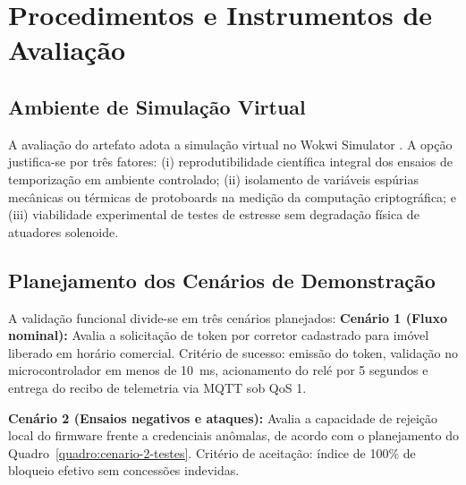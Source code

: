 \section{Procedimentos e Instrumentos de Avaliação}
\label{sec:procedimentos-avaliacao}

\subsection{Ambiente de Simulação Virtual}
\label{subsec:justificativa-wokwi}

A avaliação do artefato adota a simulação virtual no Wokwi Simulator \cite{simperf2024}. A opção justifica-se por três fatores: (i) reprodutibilidade científica integral dos ensaios de temporização em ambiente controlado; (ii) isolamento de variáveis espúrias mecânicas ou térmicas de protoboards na medição da computação criptográfica; e (iii) viabilidade experimental de testes de estresse sem degradação física de atuadores solenoide.

\subsection{Planejamento dos Cenários de Demonstração}
\label{sec:cenarios-teste}

A validação funcional divide-se em três cenários planejados:
\label{subsec:cenario-1}
\textbf{Cenário 1 (Fluxo nominal):} Avalia a solicitação de token por corretor cadastrado para imóvel liberado em horário comercial. Critério de sucesso: emissão do token, validação no microcontrolador em menos de 10~ms, acionamento do relé por 5 segundos e entrega do recibo de telemetria via MQTT sob QoS 1.

\label{subsec:cenario-2}
\textbf{Cenário 2 (Ensaios negativos e ataques):} Avalia a capacidade de rejeição local do firmware frente a credenciais anômalas, de acordo com o planejamento do Quadro~\ref{quadro:cenario-2-testes}. Critério de aceitação: índice de 100\% de bloqueio efetivo sem concessões indevidas.

